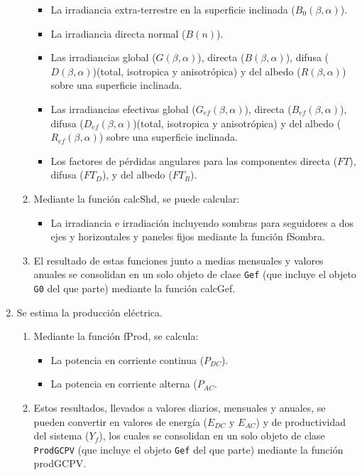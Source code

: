 \begin{enumerate}
\begin{enumerate}
\begin{itemize}
\item La irradiancia extra-terrestre en la superficie inclinada (\(B_0(\beta, \alpha)\)).
\item La irradiancia directa normal (\(B(n)\)).
\item Las irradiancias global (\(G(\beta, \alpha)\)), directa (\(B(\beta, \alpha)\)), difusa (\(D(\beta, \alpha)\))(total, isotropica y anisotrópica) y del albedo (\(R(\beta, \alpha)\)) sobre una superficie inclinada.
\item Las irradiancias efectivas global (\(G_{ef}(\beta, \alpha)\)), directa (\(B_{ef}(\beta, \alpha)\)), difusa (\(D_{ef}(\beta, \alpha)\))(total, isotropica y anisotrópica) y del albedo (\(R_{ef}(\beta, \alpha)\)) sobre una superficie inclinada.
\item Los factores de pérdidas angulares para las componentes directa (\(FT\)), difusa (\(FT_D\)), y del albedo (\(FT_R\)).
\end{itemize}
\item Mediante la función calcShd, se puede calcular:
\begin{itemize}
\item La irradiancia e irradiación incluyendo sombras para seguidores a dos ejes y horizontales y paneles fijos mediante la función fSombra.
\end{itemize}
\item El resultado de estas funciones junto a medias mensuales y valores anuales se consolidan en un solo objeto de clase \texttt{Gef} (que incluye el objeto \texttt{G0} del que parte) mediante la función calcGef.
\end{enumerate}
\item Se estima la producción eléctrica.
\begin{enumerate}
\item Mediante la función fProd, se calcula:
\begin{itemize}
\item La potencia en corriente continua (\(P_{DC}\)).
\item La potencia en corriente alterna (\(P_{AC}\).
\end{itemize}
\item Estos resultados, llevados a valores diarios, mensuales y anuales, se pueden convertir en valores de energía (\(E_{DC}\) y \(E_{AC}\)) y de productividad del sistema (\(Y_f\)), los cuales se consolidan en un solo objeto de clase \texttt{ProdGCPV} (que incluye el objeto \texttt{Gef} del que parte) mediante la función prodGCPV.
\end{enumerate}
\end{enumerate}
